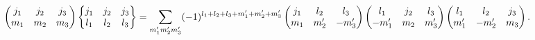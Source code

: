 \[\begin{pmatrix}j_{1}&j_{2}&j_{3}\\
m_{1}&m_{2}&m_{3}\end{pmatrix}\begin{Bmatrix}j_{1}&j_{2}&j_{3}\\
l_{1}&l_{2}&l_{3}\end{Bmatrix}=\sum_{m^{\prime}_{1}m^{\prime}_{2}m^{\prime}_{3%
}}(-1)^{l_{1}+l_{2}+l_{3}+m^{\prime}_{1}+m^{\prime}_{2}+m^{\prime}_{3}}\begin{%
pmatrix}j_{1}&l_{2}&l_{3}\\
m_{1}&m^{\prime}_{2}&-m^{\prime}_{3}\end{pmatrix}\begin{pmatrix}l_{1}&j_{2}&l_%
{3}\\
-m^{\prime}_{1}&m_{2}&m^{\prime}_{3}\end{pmatrix}\begin{pmatrix}l_{1}&l_{2}&j_%
{3}\\
m^{\prime}_{1}&-m^{\prime}_{2}&m_{3}\end{pmatrix}.\]